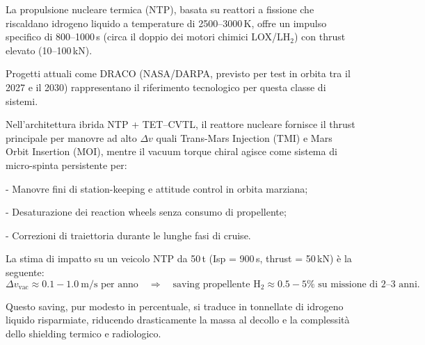 \documentclass[11pt,a4paper]{article}
\theoremstyle{plain}
\theoremstyle{definition}
\begin{document}
\vspace{0.2cm}

La propulsione nucleare termica (NTP), basata su reattori a fissione che riscaldano idrogeno liquido a temperature di 2500–3000\,K, offre un impulso specifico di 800–1000\,s (circa il doppio dei motori chimici LOX/LH$_2$) con thrust elevato (10–100\,kN). 

\vspace{0.3cm}


Progetti attuali come DRACO (NASA/DARPA, previsto per test in orbita tra il 2027 e il 2030) rappresentano il riferimento tecnologico per questa classe di sistemi.


\vspace{0.6cm}

Nell'architettura ibrida NTP + TET--CVTL, il reattore nucleare fornisce il thrust principale per manovre ad alto $\Delta v$ quali Trans-Mars Injection (TMI) e Mars Orbit Insertion (MOI), mentre il vacuum torque chiral agisce come sistema di micro-spinta persistente per:

\vspace{0.3cm}
- Manovre fini di station-keeping e attitude control in orbita marziana;

\vspace{0.2cm}
- Desaturazione dei reaction wheels senza consumo di propellente;


\vspace{0.2cm}
- Correzioni di traiettoria durante le lunghe fasi di cruise.

\vspace{0.4cm}

La stima di impatto su un veicolo NTP da 50\,t (Isp = 900\,s, thrust = 50\,kN) è la seguente:
\begin{equation}
\Delta v_{\text{vac}} \approx 0.1 - 1.0~\text{m/s per anno} \quad \Rightarrow \quad 
\text{saving propellente H$_2$} \approx 0.5 - 5\% \text{ su missione di 2--3 anni}.
\label{eq:ntp_hybrid_saving}
\end{equation}


\vspace{0.2cm}

Questo saving, pur modesto in percentuale, si traduce in tonnellate di idrogeno liquido risparmiate, riducendo drasticamente la massa al decollo e la complessità dello shielding termico e radiologico.



\vspace{0.3cm}
\end{document}
